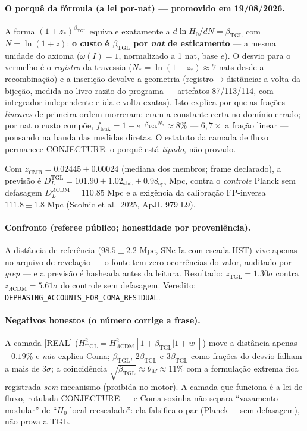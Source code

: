 \documentclass[11pt]{article}
\newcommand{\bTGL}{\beta_{\mathrm{TGL}}}\newcommand{\Msun}{M_{\odot}}\newcommand{\TGL}{\mathrm{TGL}}
\theoremstyle{definition}\newtheorem{deriv}{Derivação}
\begin{document}
\paragraph{O porquê da fórmula (a lei por-nat) --- promovido em 19/08/2026.} A forma $(1+z_*)^{\bTGL}$ equivale exatamente a $d\ln H_0/dN=\bTGL$ com $N=\ln(1+z)$: \textbf{o custo é $\bTGL$ por \emph{nat} de esticamento} --- a mesma unidade do axioma ($\omega(I)=1$, normalizado a 1 nat, base $e$). O desvio para o vermelho é o \emph{registro} da travessia ($N_*=\ln(1+z_*)\approx 7$ nats desde a recombinação) e a inscrição devolve a geometria (registro$\to$distância: a volta da bijeção, medida no livro-razão do programa --- artefatos 87/113/114, com integrador independente e ida-e-volta exatas). Isto explica por que as frações \emph{lineares} de primeira ordem morreram: eram a constante certa no domínio errado; por nat o custo compõe, $f_{\mathrm{leak}}=1-e^{-\bTGL N_*}\approx 8\%$ --- $6{,}7\times$ a fração linear --- pousando na banda das medidas diretas. O estatuto da camada de fluxo permanece \textsf{CONJECTURE}: o porquê está \emph{tipado}, não provado.

Com $z_{\mathrm{CMB}}=0.02445\pm0.00024$ (mediana dos membros; frame declarado), a previsão é $D_L^{\mathrm{TGL}}=101.90\pm1.02_{\mathrm{stat}}\pm0.98_{\mathrm{sys}}$ Mpc, contra o \emph{controle} Planck sem defasagem $D_L^{\Lambda\mathrm{CDM}}=110.85$ Mpc e a exigência da calibração FP-inversa $111.8\pm1.8$ Mpc (Scolnic et al.\ 2025, ApJL 979 L9).

\paragraph{Confronto (referee público; honestidade por proveniência).} A distância de referência ($98.5\pm2.2$ Mpc, SNe Ia com escada HST) vive apenas no arquivo de revelação --- o fonte tem zero ocorrências do valor, auditado por \emph{grep} --- e a previsão é hasheada antes da leitura. Resultado: $z_{\mathrm{TGL}}=1.30\sigma$ contra $z_{\Lambda\mathrm{CDM}}=5.61\sigma$ do controle sem defasagem. Veredito: \texttt{DEPHASING\_ACCOUNTS\_FOR\_COMA\_RESIDUAL}.

\paragraph{Negativos honestos (o número corrige a frase).} A camada [REAL] ($H^2_{\mathrm{TGL}}=H^2_{\Lambda\mathrm{CDM}}[1+\bTGL|1+w|]$) move a distância apenas $-0.19\%$ e \emph{não} explica Coma; $\bTGL$, $2\bTGL$ e $3\bTGL$ como frações do desvio falham a mais de $3\sigma$; a coincidência $\sqrt{\bTGL}\approx\theta_M\approx11\%$ com a formulação extrema fica registrada \emph{sem} mecanismo (proibida no motor). A camada que funciona é a lei de fluxo, rotulada \textsf{CONJECTURE} --- e Coma sozinha não separa ``vazamento modular'' de ``$H_0$ local reescalado'': ela falsifica o par (Planck + sem defasagem), não prova a TGL.
\end{document}
